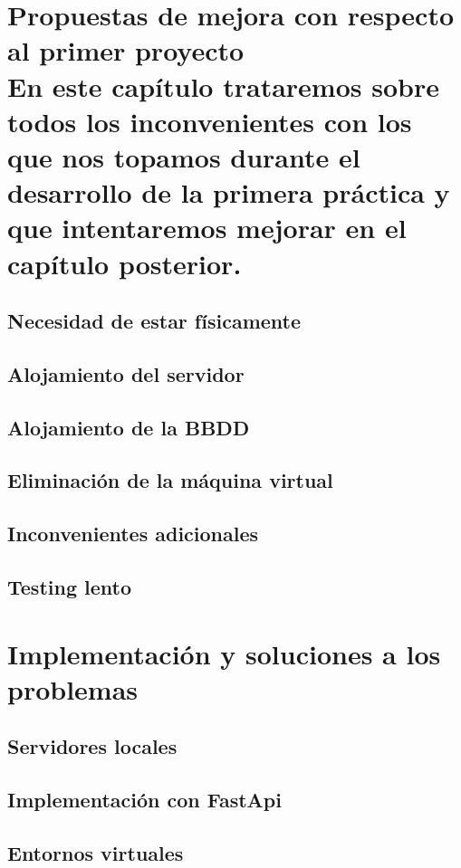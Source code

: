 \documentclass[12pt]{report}
\begin{document}
\chapter[Propuestas]{Propuestas de mejora con respecto al primer proyecto\\ \normalsize En este capítulo trataremos sobre todos los inconvenientes con los que nos topamos durante el desarrollo de la primera práctica y que intentaremos mejorar en el capítulo posterior.}
\section{Necesidad de estar físicamente}
\section{Alojamiento del servidor}
\section{Alojamiento de la BBDD}
\section{Eliminación de la máquina virtual} %
\section{Inconvenientes adicionales} %
\section{Testing lento}

\chapter{Implementación y soluciones a los problemas}
\section{Servidores locales}
\section{Implementación con FastApi}
\section{Entornos virtuales}%
\end{document}
